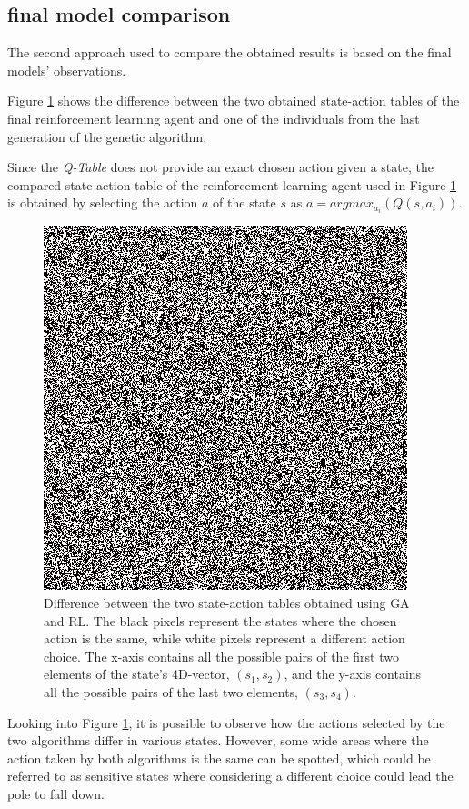 \subsection{final model comparison}

The second approach used to compare the obtained results is based on the final models' observations.

Figure \ref{figTABLEDIFF} shows the difference between the two obtained state-action tables of the final reinforcement learning agent and one of the individuals from the last generation of the genetic algorithm.

Since the \textit{Q-Table} does not provide an exact chosen action given a state, the compared state-action table of the reinforcement learning agent used in Figure \ref{figTABLEDIFF} is obtained by selecting the action $a$ of the state $s$ as $a = argmax_{a_i} (Q(s,a_i))$.

\begin{figure}[H]
	\centering
	\includegraphics [scale = 0.7]{Images/diff.png}
	\caption{Difference between the two state-action tables obtained using GA and RL. The black pixels represent the states where the chosen action is the same, while white pixels represent a different action choice. The x-axis contains all the possible pairs of the first two elements of the state's 4D-vector, $(s_1,s_2)$, and the y-axis contains all the possible pairs of the last two elements, $(s_3,s_4)$. }
	\label{figTABLEDIFF}
\end{figure}

Looking into Figure \ref{figTABLEDIFF}, it is possible to observe how the actions selected by the two algorithms differ in various states. However, some wide areas where the action taken by both algorithms is the same can be spotted, which could be referred to as sensitive states where considering a different choice could lead the pole to fall down.\\

